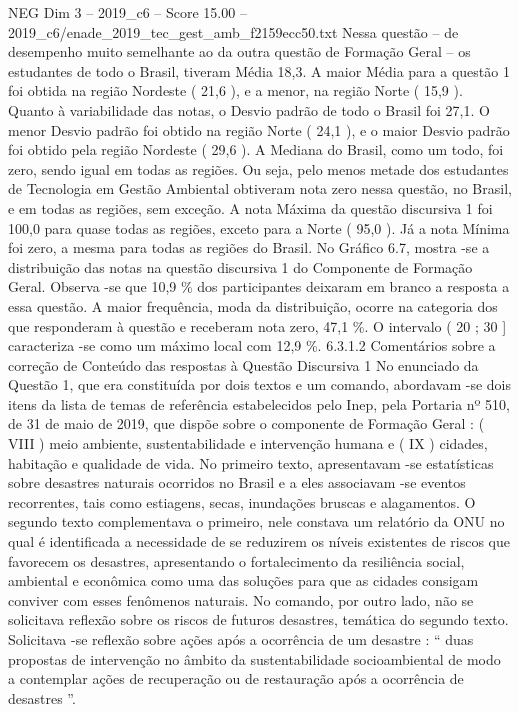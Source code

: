 \begin{textsample}{NEG Dim 3 – 2019\_c6 – Score 15.00 – 2019\_c6/enade\_2019\_tec\_gest\_amb\_f2159ecc50.txt}
Nessa questão – de desempenho muito semelhante ao da outra questão de Formação Geral – os estudantes de todo o Brasil, tiveram Média 18,3.
A maior Média para a questão 1 foi obtida na região Nordeste ( 21,6 ), e a menor, na região Norte ( 15,9 ).
Quanto à variabilidade das notas, o Desvio padrão de todo o Brasil foi 27,1.
O menor Desvio padrão foi obtido na região Norte ( 24,1 ), e o maior Desvio padrão foi obtido pela região Nordeste ( 29,6 ).
A Mediana do Brasil, como um todo, foi zero, sendo igual em todas as regiões.
Ou seja, pelo menos metade dos estudantes de Tecnologia em Gestão Ambiental obtiveram nota zero nessa questão, no Brasil, e em todas as regiões, sem exceção.
A nota Máxima da questão discursiva 1 foi 100,0 para quase todas as regiões, exceto para a Norte ( 95,0 ).
Já a nota Mínima foi zero, a mesma para todas as regiões do Brasil.
No Gráfico 6.7, mostra -se a distribuição das notas na questão discursiva 1 do Componente de Formação Geral.
Observa -se que 10,9 \% dos participantes deixaram em branco a resposta a essa questão.
A maior frequência, moda da distribuição, ocorre na categoria dos que responderam à questão e receberam nota zero, 47,1 \%.
O intervalo ( 20 ; 30 ] caracteriza -se como um máximo local com 12,9 \%. 6.3.1.2 Comentários sobre a correção de Conteúdo das respostas à Questão Discursiva 1 No enunciado da Questão 1, que era constituída por dois textos e um comando, abordavam -se dois itens da lista de temas de referência estabelecidos pelo Inep, pela Portaria nº 510, de 31 de maio de 2019, que dispõe sobre o componente de Formação Geral : ( VIII ) meio ambiente, sustentabilidade e intervenção humana e ( IX ) cidades, habitação e qualidade de vida.
No primeiro texto, apresentavam -se estatísticas sobre desastres naturais ocorridos no Brasil e a eles associavam -se eventos recorrentes, tais como estiagens, secas, inundações bruscas e alagamentos.
O segundo texto complementava o primeiro, nele constava um relatório da ONU no qual é identificada a necessidade de se reduzirem os níveis existentes de riscos que favorecem os desastres, apresentando o fortalecimento da resiliência social, ambiental e econômica como uma das soluções para que as cidades consigam conviver com esses fenômenos naturais.
No comando, por outro lado, não se solicitava reflexão sobre os riscos de futuros desastres, temática do segundo texto.
Solicitava -se reflexão sobre ações após a ocorrência de um desastre : “ duas propostas de intervenção no âmbito da sustentabilidade socioambiental de modo a contemplar ações de recuperação ou de restauração após a ocorrência de desastres ”.

\end{textsample}

